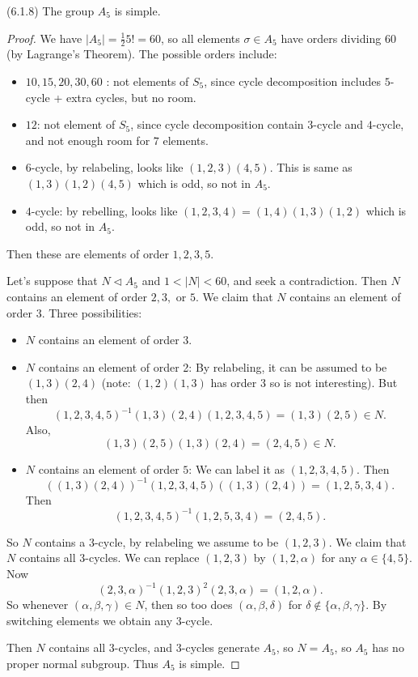 \begin{theorem}
	(6.1.8)
	The group $A_5$ is simple.
\end{theorem}
\begin{proof}
	We have $|A_5| = \frac{1}{2}5! = 60$, so all elements $\sigma \in A_5$ have orders dividing $60$ (by Lagrange's Theorem). The possible orders include:
	 \begin{itemize}
		\item $10,15,20,30,60$ : not elements of $S_5$, since cycle decomposition includes $5$-cycle + extra cycles, but no room.
		\item $12$: not element of  $S_5$, since cycle decomposition contain $3$-cycle and $4$-cycle, and not enough room for $7$ elements.
		\item $6$-cycle, by relabeling, looks like $(1,2,3)(4,5)$. This is same as $(1,3)(1,2)(4,5)$ which is odd, so not in $A_5$.
		\item $4$-cycle: by rebelling, looks like $(1,2,3,4) = (1,4)(1,3)(1,2)$ which is odd, so not in $A_5$.
	\end{itemize}
	Then these are elements of order $1,2,3,5$.

	Let's suppose that $N \triangleleft A_5$ and $1< |N| < 60$, and seek a contradiction. Then $N$ contains an element of order $2,3,$ or $5$. We claim that $N$ contains an element of order $3$. Three possibilities:
	\begin{itemize}
		\item  $N$ contains an element of order $3$.
		\item $N$ contains an element of order 2: By relabeling, it can be assumed to be $(1,3)(2,4)$ (note: $(1,2)(1,3)$ has order 3 so is not interesting). But then \[
				(1,2,3,4,5)^{-1}(1,3)(2,4)(1,2,3,4,5) 
				= (1,3)(2,5)
				\in N
		.\] 
		Also, \[
			(1,3)(2,5)(1,3)(2,4)
			= (2, 4, 5) \in N
		.\] 
	\item $N$ contains an element of order $5 $: We can label it as $(1,2,3,4,5)$. Then 
		\[
			\left( (1,3)(2,4) \right) ^{-1} (1,2,3,4,5)\left( (1,3)(2,4) \right) 
			= (1,2,5,3,4)
		.\] 
		Then \[
			(1,2,3,4,5)^{-1}(1,2,5,3,4)
			= (2,4,5)
		.\] 
	\end{itemize}
	So $N$ contains a $3$-cycle, by relabeling we assume to be $(1,2,3)$. We claim that $N$ contains all $3$-cycles. We can replace $(1,2,3)$ by $(1,2,\alpha)$ for any $\alpha \in \{4,5\} $. Now \[
		(2,3,\alpha)^{-1}(1,2,3)^{2}(2,3,\alpha)
		= (1,2,\alpha)
	.\] 
	So whenever $(\alpha,\beta,\gamma) \in N$, then so too does $(\alpha,\beta,\delta)$ for $\delta \not\in \{\alpha,\beta,\gamma\} $. By switching elements we obtain any $3$-cycle.

	Then $N$ contains all $3$-cycles, and $3$-cycles generate $A_5$, so $N = A_5$, so $A_5$ has no proper normal subgroup. Thus $A_5$ is simple.
\end{proof}
